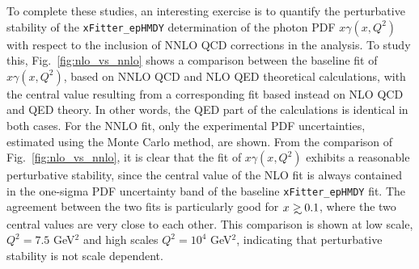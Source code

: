 To complete these studies, an interesting exercise is to quantify the perturbative stability of
the {\tt xFitter\_epHMDY}
determination of the photon PDF $x\gamma(x,Q^2)$ with respect to the inclusion
of NNLO QCD corrections in the analysis.
%
To study this, Fig.~\ref{fig:nlo_vs_nnlo} shows a
comparison between the baseline fit of $x\gamma(x,Q^2)$, based on NNLO
QCD and NLO QED theoretical calculations, with the central value resulting from a
corresponding fit
based instead on NLO QCD and QED theory.
%
In other words, the QED part of the calculations is identical in both cases.
%
For the NNLO fit, only the experimental PDF uncertainties, estimated
using the Monte Carlo method, are shown.
%
From the comparison of Fig.~\ref{fig:nlo_vs_nnlo}, it is clear that the
fit of $x\gamma(x,Q^2)$ exhibits a reasonable perturbative stability,
since the central value of the NLO fit is always contained in the
one-sigma PDF uncertainty band of the baseline {\tt xFitter\_epHMDY} fit.
%
The agreement between the two fits is particularly good for
$x\gsim 0.1$, where the two central values are very close to each
other.
%
This comparison is shown at low scale, $Q^2=7.5$ GeV$^2$ and high scales $Q^2=10^4$ GeV$^2$,
indicating that perturbative stability is not scale dependent.

